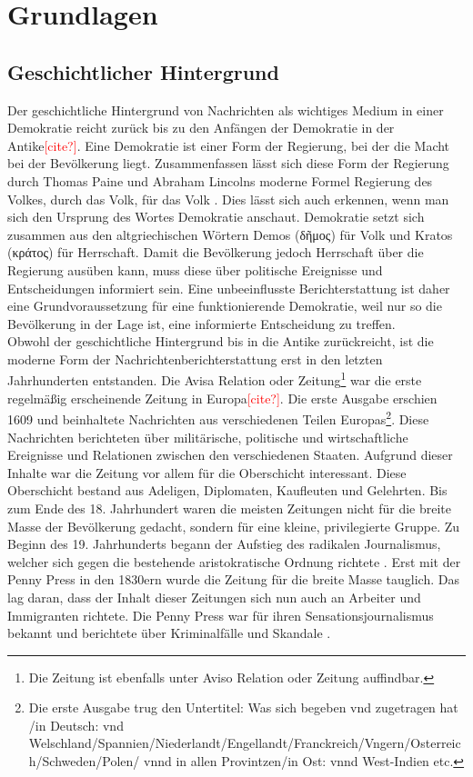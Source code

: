 \section{Grundlagen}

\subsection{Geschichtlicher Hintergrund}
Der geschichtliche Hintergrund von Nachrichten als wichtiges Medium in einer Demokratie reicht zurück bis zu den Anfängen der Demokratie in der Antike\textcolor{red}{[cite?]}.
Eine Demokratie ist einer Form der Regierung, bei der die Macht bei der Bevölkerung liegt.
Zusammenfassen lässt sich diese Form der Regierung durch Thomas Paine und Abraham Lincolns moderne Formel \glqq Regierung des Volkes, durch das Volk, für das Volk\grqq{} \cite{lincoln}.
Dies lässt sich auch erkennen, wenn man sich den Ursprung des Wortes Demokratie anschaut.
Demokratie setzt sich zusammen aus den altgriechischen Wörtern Demos (\textgreek{δῆμος}) für Volk und Kratos (\textgreek{κράτος}) für Herrschaft.
Damit die Bevölkerung jedoch Herrschaft über die Regierung ausüben kann, muss diese über politische Ereignisse und Entscheidungen informiert sein.
Eine unbeeinflusste Berichterstattung ist daher eine Grundvoraussetzung für eine funktionierende Demokratie, weil nur so die Bevölkerung in der Lage ist, eine informierte Entscheidung zu treffen. \\

Obwohl der geschichtliche Hintergrund bis in die Antike zurückreicht, ist die moderne Form der Nachrichtenberichterstattung erst in den letzten Jahrhunderten entstanden.
Die Avisa Relation oder Zeitung\footnote{Die Zeitung ist ebenfalls unter Aviso Relation oder Zeitung auffindbar.} war die erste regelmäßig erscheinende Zeitung in Europa\textcolor{red}{[cite?]}.
Die erste Ausgabe erschien 1609 und beinhaltete Nachrichten aus verschiedenen Teilen Europas\footnote{Die erste Ausgabe trug den Untertitel: Was sich begeben vnd zugetragen hat /in Deutsch: vnd Welschland/Spannien/Niederlandt/Engellandt/Franckreich/Vngern/Osterreich/Schweden/Polen/ vnnd in allen Provintzen/in Ost: vnnd West-Indien etc.}.
Diese Nachrichten berichteten über militärische, politische und wirtschaftliche Ereignisse und Relationen zwischen den verschiedenen Staaten.
Aufgrund dieser Inhalte war die Zeitung vor allem für die Oberschicht interessant.
Diese Oberschicht bestand aus Adeligen, Diplomaten, Kaufleuten und Gelehrten.
Bis zum Ende des 18. Jahrhundert waren die meisten Zeitungen nicht für die breite Masse der Bevölkerung gedacht, sondern für eine kleine, privilegierte Gruppe.
Zu Beginn des 19. Jahrhunderts begann der Aufstieg des radikalen Journalismus, welcher sich gegen die bestehende aristokratische Ordnung richtete \cite{media-democracy}.
Erst mit der Penny Press in den 1830ern wurde die Zeitung für die breite Masse tauglich.
Das lag daran, dass der Inhalt dieser Zeitungen sich nun auch an Arbeiter und Immigranten richtete.
Die Penny Press war für ihren Sensationsjournalismus bekannt und berichtete über Kriminalfälle und Skandale \cite{penny-press}.


